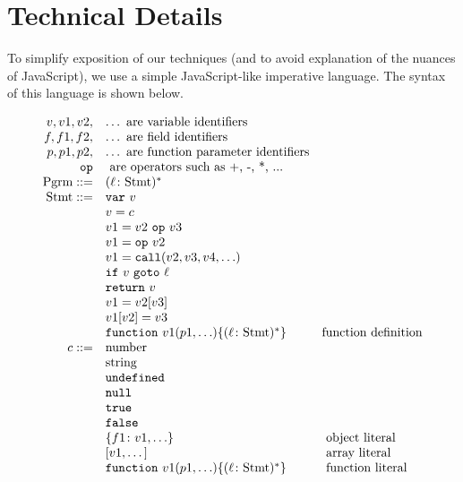 \documentclass{sig-alternate}
\newcommand \dsl [1] {\ensuremath{{\tt #1}}\xspace}
\begin{document}
\section{Technical Details}
\label{sec:technical-details}

To simplify exposition of our techniques (and to avoid explanation of
the nuances of JavaScript), we use a simple JavaScript-like imperative
language.  The syntax of this language is shown below.

{\scriptsize
\[
\begin{array}{rll}
v, v1, v2, &  \ldots \mbox{ are variable identifiers}\\
f, f1, f2, & \ldots \mbox{ are field identifiers}\\
p, p1, p2, & \ldots \mbox{ are function parameter identifiers}\\
\dsl{op} & \mbox{ are operators such as +, -, *, ...} \\
\mbox{Pgrm} ::= & (\ell\colon \mbox{Stmt})^*\\
\mbox{Stmt} ::= &  \dsl{var}\ v\\
  & v = c\\
  &   v1 = v2\ \dsl{op}\ v3\\
  &   v1 = \dsl{op}\ v2\\
  &   v1 = \dsl{call}(v2, v3, v4, \ldots)\\
  &   \dsl{if}\ v \ \dsl{goto}\ \ell\\
  &   \dsl{return}\ v\\
  &   v1 = v2[v3]\\
  &   v1[v2] = v3\\
  &   \dsl{function}\ v1(p1, \ldots) \{ (\ell\colon \mbox{Stmt})^* \} & \mbox{function definition}\\
c ::= & \mbox{number}\\
  & \mbox{string} \\
  & \dsl{undefined} \\
  & \dsl{null} \\
  & \dsl{true}\\
  & \dsl{false}\\
  & \{f1\colon v1, \ldots\} &\mbox{ object literal}\\
  & [v1, \dots] &\mbox{ array literal}\\
  & \dsl{function}\ v1(p1, \ldots) \{ (\ell\colon \mbox{Stmt})^* \} & \mbox{
    function literal}\\
\end{array}
\]
}
\end{document}
